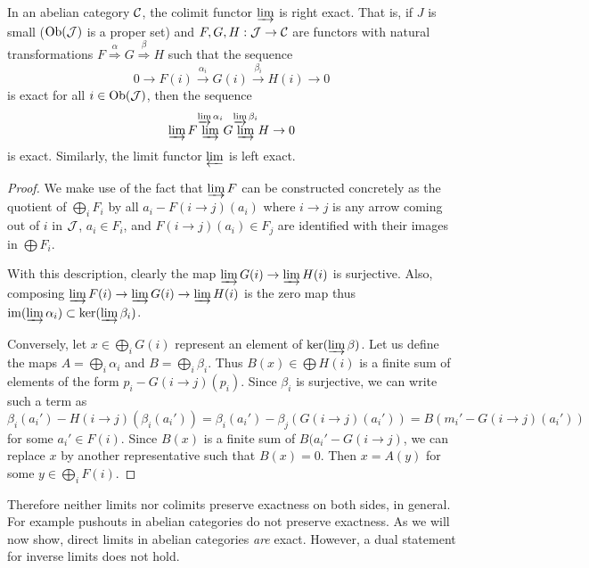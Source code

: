 \begin{prop}
    In an abelian category $\mathcal{C}$, the colimit functor $\varinjlim$ is right exact. That is, if $J$ is small ($\operatorname{Ob}(\mathcal{J})$ is a proper set) and $F,G,H:\mathcal{J}\to \mathcal{C}$ are functors with natural transformations $F\overset{\alpha}{\Longrightarrow}G\overset{\beta}{\Longrightarrow}H$ such that the sequence 
    \[0\to F(i)\overset{\alpha_i}{\to} G(i)\overset{\beta_i}{\to} H(i)\to 0\] is exact for all $i\in\operatorname{Ob}(\mathcal{J})$, then the sequence
    \[\varinjlim F\overset{\varinjlim \alpha_i}{\varinjlim} G\overset{\varinjlim \beta_i}{\varinjlim} H\to 0\]
    is exact. Similarly, the limit functor $\varprojlim$ is left exact.
\end{prop}
\begin{proof}
    We make use of the fact that $\varinjlim F$ can be constructed concretely as the quotient of $\bigoplus_i F_i$ by all $a_i-F(i\to j)(a_i)$ where $i\to j$ is any arrow coming out of $i$ in $\mathcal{J}$, $a_i\in F_i$, and $F(i\to j)(a_i)\in F_j$ are identified with their images in $\bigoplus F_i$.

    With this description, clearly the map $\varinjlim G(i)\to \varinjlim H(i)$ is surjective. Also, composing $\varinjlim F(i)\to \varinjlim G(i)\to\varinjlim H(i)$ is the zero map thus $\operatorname{im}(\varinjlim \alpha_i)\subset \ker(\varinjlim \beta_i)$.

    Conversely, let $x\in \bigoplus_i G(i)$ represent an element of $\ker(\varinjlim \beta)$. Let us define the maps $A=\bigoplus_i \alpha_i$ and $B=\bigoplus_i \beta_i$. Thus $B(x)\in \bigoplus H(i)$ is a finite sum of elements of the form $p_i-G(i\to j)(p_i)$. Since $\beta_i$ is surjective, we can write such a term as 
    \[\beta_i(a_i')-H(i\to j)(\beta_i(a_i'))=\beta_i(a_i')-\beta_j(G(i\to j)(a_i'))=B(m_i'-G(i\to j)(a_i'))\]
    for some $a_i'\in F(i)$. Since $B(x)$ is a finite sum of $B(a_i'-G(i\to j)$, we can replace $x$ by another representative such that $B(x)=0$. Then $x=A(y)$ for some $y\in \bigoplus_i F(i)$.
\end{proof}

Therefore neither limits nor colimits preserve exactness on both sides, in general. For example pushouts in abelian categories do not preserve exactness. As we will now show, direct limits in abelian categories \emph{are} exact. However, a dual statement for inverse limits does not hold.

